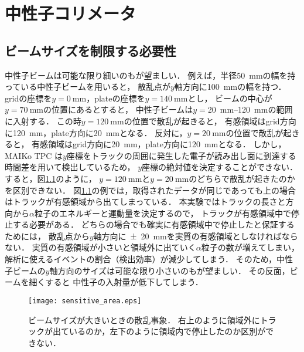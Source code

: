 \documentclass[../master]{subfiles}
\begin{document}
\chapter{中性子コリメータ}
\label{chap::collimator}
\section{ビームサイズを制限する必要性}
中性子ビームは可能な限り細いのもが望ましい．
例えば，半径\SI{50}{\milli\metre}の幅を持っている中性子ビームを用いると，
散乱点が$y$軸方向に\SI{100}{\milli\metre}の幅を持つ．
gridの座標を$y = \SI{0}{\milli\metre}$，plateの座標を$y = \SI{140}{\milli\metre}$とし，
ビームの中心が$y = \SI{70}{\milli\metre}$の位置にあるとすると，
中性子ビームは$y = $\SIrange{20}{120}{\milli\metre}の範囲に入射する．
この時$y = \SI{120}{\milli\metre}$の位置で散乱が起きると，
有感領域はgrid方向に\SI{120}{\milli\metre}，plate方向に\SI{20}{\milli\metre}となる．
反対に，$y = \SI{20}{\milli\metre}$の位置で散乱が起きると，
有感領域はgrid方向に\SI{20}{\milli\metre}，plate方向に\SI{120}{\milli\metre}となる．
しかし，MAIKo TPC は$y$座標をトラックの周囲に発生した電子が読み出し面に到達する時間差を用いて検出しているため，
$y$座標の絶対値を決定することができない．
すると，図\ref{fig::sensitive_area}のように，
$y = \SI{120}{\milli\metre}$と$y = \SI{20}{\milli\metre}$のどちらで散乱が起きたのかを区別できない．
図\ref{fig::sensitive_area}の例では，取得されたデータが同じであっても上の場合はトラックが有感領域から出てしまっている．
本実験ではトラックの長さと方向から$\alpha$粒子のエネルギーと運動量を決定するので，
トラックが有感領域中で停止する必要がある．
どちらの場合でも確実に有感領域中で停止したと保証するためには，
散乱点から$y$軸方向に\SI{\pm20}{\milli\metre}を実質の有感領域としなければならない．
実質の有感領域が小さいと領域外に出ていく$\alpha$粒子の数が増えてしまい，
解析に使えるイベントの割合（検出効率）が減少してしまう．
そのため，中性子ビームの$y$軸方向のサイズは可能な限り小さいのもが望ましい．
その反面，ビームを細くすると
中性子の入射量が低下してしまう．
\begin{figure}
  \centering
  \texttt{[image: sensitive\_area.eps]}
  \caption[ビームサイズが大きいときの散乱事象．]
          {ビームサイズが大きいときの散乱事象．
            右上のように領域外にトラックが出ているのか，左下のように領域内で停止したのか区別ができない．}
  \label{fig::sensitive_area}
\end{figure}
\end{document}
